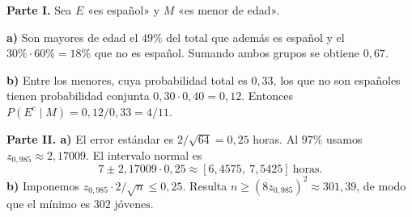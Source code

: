 \textbf{Parte I.} Sea $E$ «es español» y $M$ «es menor de edad».

\textbf{a)} Son mayores de edad el $49\%$ del total que además es español y el $30\%\cdot60\%=18\%$ que no es español. Sumando ambos grupos se obtiene $\boxed{0{,}67}$.

\textbf{b)} Entre los menores, cuya probabilidad total es $0{,}33$, los que no son españoles tienen probabilidad conjunta $0{,}30\cdot0{,}40=0{,}12$. Entonces $P(E^c\mid M)=0{,}12/0{,}33=\boxed{4/11}$.

\textbf{Parte II. a)} El error estándar es $2/\sqrt{64}=0{,}25$ horas. Al $97\%$ usamos $z_{0{,}985}\approx2{,}17009$. El intervalo normal es
\[
7\pm2{,}17009\cdot0{,}25
\approx\boxed{[6{,}4575,\ 7{,}5425]}\ \text{horas}.
\]
\textbf{b)} Imponemos $z_{0{,}985}\cdot2/\sqrt n\le0{,}25$. Resulta $n\ge(8z_{0{,}985})^2\approx301{,}39$, de modo que el mínimo es $\boxed{302\text{ jóvenes}}$.
